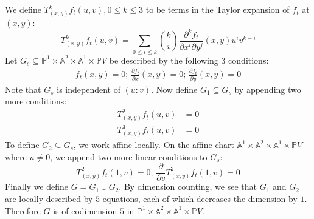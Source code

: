 \documentclass[12pt]{article}
\theoremstyle{plain}
\theoremstyle{definition}
\newcommand{\IA}{\mathbb{A}}
\newcommand{\IP}{\mathbb{P}}
\newcommand{\<}{\langle}
\renewcommand{\>}{\rangle}
\newcommand{\p}{\partial}
\begin{document}
We define $T^k_{(x, y)}f_{t} (u, v), 0 \le k \le 3$ to be terms in the Taylor expansion of $f_{t}$ at $(x, y)$:
$$ T^k_{(x, y)}f_{t} (u, v) = \sum_{0 \le i \le k} {k \choose i} \frac{\p^k f_t}{\p x^i \p y^j}(x, y) u^i v^{k - i} $$
Let $G_s \subseteq \IP^1 \times \IA^2 \times \IA^1 \times \IP V$ be described by the following $3$ conditions:
\begin{align*}
f_t(x , y) = 0 ; \,
\frac{\p f_t}{\p x} (x, y) = 0 ; \,
\frac{\p f_t}{\p y} (x, y) = 0 
\end{align*}
Note that $G_s$ is independent of $(u : v)$. Now define $G_1 \subseteq G_s$ by appending two more conditions:
\begin{align*}
T^2_{(x, y)}f_{t} (u, v) &= 0 \\
T^3_{(x, y)}f_{t} (u, v) &= 0 
\end{align*}
To define $G_2 \subseteq G_s$, we work affine-locally. On the affine chart $\IA^1 \times \IA^2 \times \IA^1 \times \IP V$ where $u \neq 0$, we append two more linear conditions to $G_s$: 
$$ T^2_{(x, y)}f_{t} (1, v) = 0;\, \frac{\p}{\p v} T^2_{(x, y)}f_{t} (1, v) = 0 $$
Finally we define $G = G_1 \cup G_2$. 
By dimension counting, we see that $G_1$ and $G_2$ are locally described by $5$ equations, each of which decreases the dimension by $1$. Therefore $G$ is of codimension $5$ in $\IP^1 \times \IA^2 \times \IA^1 \times \IP V$. 
\end{document}
